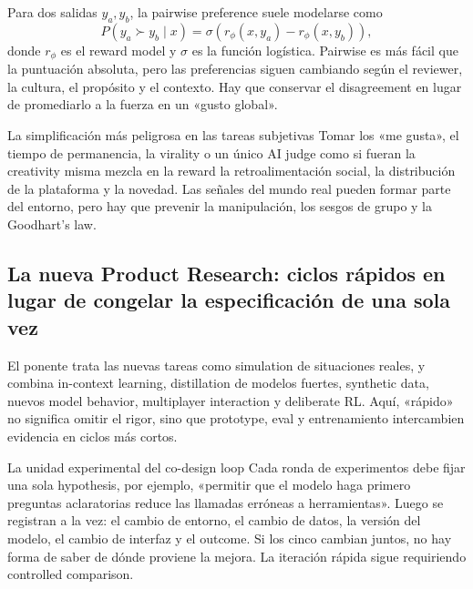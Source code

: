
Para dos salidas $y_a,y_b$, la pairwise preference suele modelarse como
\[
P(y_a\succ y_b\mid x)=\sigma\!\left(r_\phi(x,y_a)-r_\phi(x,y_b)\right),
\]
donde $r_\phi$ es el reward model y $\sigma$ es la función logística. Pairwise es más fácil que la puntuación absoluta, pero las preferencias siguen cambiando según el reviewer, la cultura, el propósito y el contexto. Hay que conservar el disagreement en lugar de promediarlo a la fuerza en un «gusto global».

\begin{warningbox}{La simplificación más peligrosa en las tareas subjetivas}
Tomar los «me gusta», el tiempo de permanencia, la virality o un único AI judge como si fueran la creativity misma mezcla en la reward la retroalimentación social, la distribución de la plataforma y la novedad. Las señales del mundo real pueden formar parte del entorno, pero hay que prevenir la manipulación, los sesgos de grupo y la Goodhart's law.
\end{warningbox}

\subsection{La nueva Product Research: ciclos rápidos en lugar de congelar la especificación de una sola vez}

El ponente trata las nuevas tareas como simulation de situaciones reales, y combina in-context learning, distillation de modelos fuertes, synthetic data, nuevos model behavior, multiplayer interaction y deliberate RL. Aquí, «rápido» no significa omitir el rigor, sino que prototype, eval y entrenamiento intercambien evidencia en ciclos más cortos.


\begin{importantbox}{La unidad experimental del co-design loop}
Cada ronda de experimentos debe fijar una sola hypothesis, por ejemplo, «permitir que el modelo haga primero preguntas aclaratorias reduce las llamadas erróneas a herramientas». Luego se registran a la vez: el cambio de entorno, el cambio de datos, la versión del modelo, el cambio de interfaz y el outcome. Si los cinco cambian juntos, no hay forma de saber de dónde proviene la mejora. La iteración rápida sigue requiriendo controlled comparison.
\end{importantbox}

